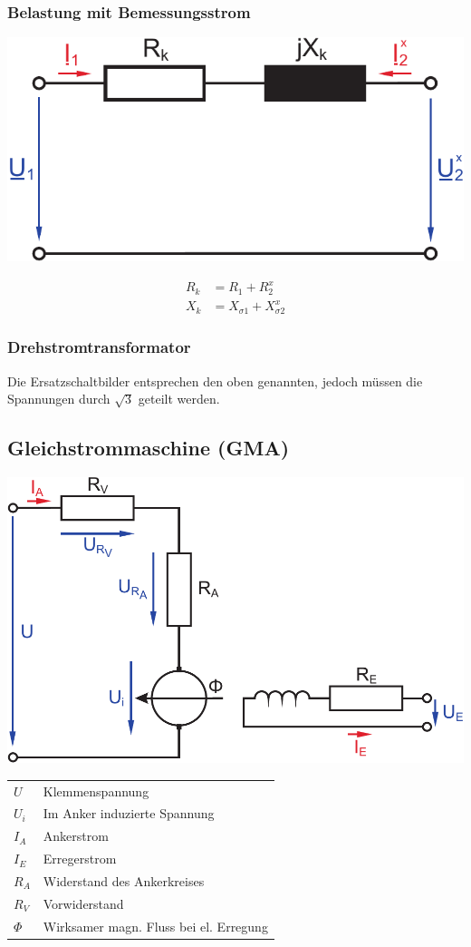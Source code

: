 \documentclass[a4paper,twocolumn,10pt]{article}
\begin{document}
\subsubsection{Belastung mit Bemessungsstrom}
\begin{center}
\includegraphics[width=0.6\columnwidth]{Grafiken/Trafo_BS_ESB}
\end{center}
\begin{equation*}
\begin{split}
R_k&=R_1+R_2^x\\
X_k&=X_{\sigma 1}+X_{\sigma 2}^x
\end{split}
\end{equation*}

\subsubsection{Drehstromtransformator}
Die Ersatzschaltbilder entsprechen den oben genannten, jedoch müssen die Spannungen durch $\sqrt{3}$ geteilt werden.

\subsection{Gleichstrommaschine (GMA)}
\begin{center}
\includegraphics[width=0.95\columnwidth]{Grafiken/Gleichstrommaschine}
\end{center}
\begin{tabular}{ll}
$U$ & Klemmenspannung\\
$U_i$ & Im Anker induzierte Spannung\\
$I_A$ & Ankerstrom\\
$I_E$ & Erregerstrom\\
$R_A$ & Widerstand des Ankerkreises\\
$R_V$ & Vorwiderstand\\
$\Phi$ & Wirksamer magn. Fluss bei el. Erregung
\end{tabular}
\end{document}

